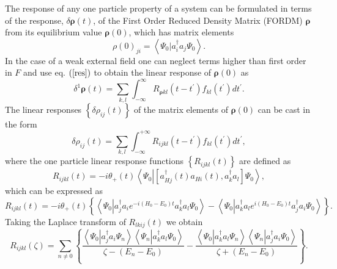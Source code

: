 \documentclass[aps,preprint]{revtex4}%
\begin{document}
The response of any one particle property of a system can be formulated in
terms of the response, $\delta\mathbf{\rho}\left(  t\right)  $, of the First
Order Reduced Density Matrix (FORDM) $\mathbf{\rho}$ from its equilibrium
value $\mathbf{\rho}\left(  0\right)  $, which has matrix elements
\begin{equation}
\rho\left(  0\right)  _{ji}=\left\langle \left.  \Psi_{0}\right\vert
a_{i}^{\dagger}a_{j}\Psi_{0}\right\rangle .
\end{equation}
In the case of a weak external field one can neglect terms higher than first
order in $F$ and use eq. $\left(  \ref{res}\right)  $ to obtain the linear
response of $\mathbf{\rho}\left(  0\right)  $ as
\begin{equation}
\delta^{1}\mathbf{\rho}\left(  t\right)  =\sum_{k,l}\int_{-\infty}^{\infty
}R_{\mathbf{\rho}kl}\left(  t-t^{\prime}\right)  f_{kl}\left(  t^{\prime
}\right)  dt^{\prime}.
\end{equation}
The linear responses $\left\{  \delta\rho_{ij}\left(  t\right)  \right\}  $ of
the matrix elements of $\mathbf{\rho}\left(  0\right)  $ can be cast in the
form
\begin{equation}
\delta\rho_{ij}\left(  t\right)  =\sum_{k,l}\int_{-\infty}^{+\infty}%
R_{ijkl}\left(  t-t^{\prime}\right)  f_{kl}\left(  t^{\prime}\right)
dt^{\prime},
\end{equation}
where the one particle linear response functions $\left\{  R_{ijkl}\left(
t\right)  \right\}  $ are defined as
\begin{equation}
R_{ijkl}\left(  t\right)  =-i\theta_{+}\left(  t\right)  \left\langle \Psi
_{0}\left\vert \left[  a_{Hj}^{\dagger}\left(  t\right)  a_{Hi}\left(
t\right)  ,a_{k}^{\dagger}a_{l}\right]  \right.  \Psi_{0}\right\rangle ,
\end{equation}
which can be expressed as
\begin{equation}
R_{ijkl}\left(  t\right)  =-i\theta_{+}\left(  t\right)  \left\{  \left\langle
\Psi_{0}\left\vert a_{j}^{\dagger}a_{i}e^{-i\left(  H_{0}-E_{0}\right)
t}a_{k}^{\dagger}a_{l}\right.  \Psi_{0}\right\rangle -\left\langle \Psi
_{0}\left\vert a_{k}^{\dagger}a_{l}e^{i\left(  H_{0}-E_{0}\right)  t}%
a_{j}^{\dagger}a_{i}\right.  \Psi_{0}\right\rangle \right\}  .
\end{equation}
Taking the Laplace transform \cite{Dunford} of $R_{lkij}\left(  t\right)  $ we
obtain
\begin{equation}
R_{ijkl}\left(  \zeta\right)  =\sum_{n\neq0}\left\{  \frac{\left\langle
\Psi_{0}\left\vert a_{j}^{\dagger}a_{i}\Psi_{n}\right.  \right\rangle
\left\langle \Psi_{n}\left\vert a_{k}^{\dagger}a_{l}\Psi_{0}\right.
\right\rangle }{\zeta-\left(  E_{n}-E_{0}\right)  }-\frac{\left\langle
\Psi_{0}\left\vert a_{k}^{\dagger}a_{l}\Psi_{n}\right.  \right\rangle
\left\langle \Psi_{n}\left\vert a_{j}^{\dagger}a_{i}\Psi_{0}\right.
\right\rangle }{\zeta+\left(  E_{n}-E_{0}\right)  }\right\}  .
\end{equation}
\end{document}
